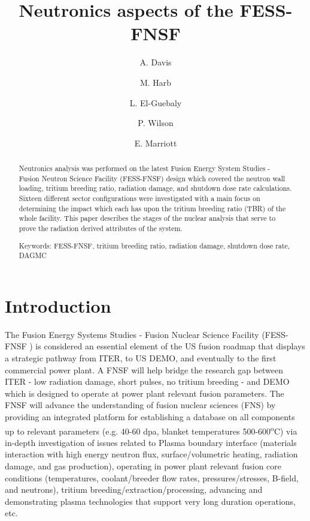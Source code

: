 \documentclass[12pt, letterpaper]{elsarticle}
\title{Neutronics aspects of the FESS-FNSF}
\author[wisc]{A. Davis\corref{cor1}}
\author[wisc]{M. Harb}
\author[wisc]{L. El-Guebaly}
\author[wisc]{P. Wilson}
\author[wisc]{E. Marriott}
\begin{document}
 
\begin{abstract}
Neutronics analysis was performed on the latest Fusion Energy System Studies - Fusion Neutron Science Facility (FESS-FNSF) design which covered the neutron wall loading, tritium breeding ratio, radiation damage, and shutdown dose rate calculations. Sixteen different sector configurations were investigated with a main focus on determining the impact which each has upon the tritium breeding ratio (TBR) of the whole facility. This paper describes the stages of the nuclear analysis that serve to prove the radiation derived attributes of the system.

\vspace{5mm}
\noindent
Keywords: FESS-FNSF, tritium breeding ratio, radiation damage, shutdown dose rate, DAGMC
\end{abstract}

\begin{titlepage}
\maketitle
\end{titlepage}

\newpage
\listoffigures

\newpage
\section{Introduction} \label{Introduction}
The Fusion Energy Systems Studies - Fusion Nuclear Science Facility (FESS-FNSF \cite{ref_1}) is considered an essential element of the US fusion roadmap that displays a strategic  pathway from ITER, to US DEMO, and eventually to the first commercial power plant. A FNSF will help bridge the research gap between ITER - low radiation damage, short pulses, no tritium breeding - and DEMO which is designed to operate at power plant relevant fusion parameters. The FNSF will advance the understanding of fusion nuclear sciences (FNS) by providing an integrated platform for establishing a database on all components up to relevant parameters (e.g. 40-60 dpa, blanket temperatures 500-600\textsuperscript{o}C) via in-depth investigation of issues related to Plasma boundary interface (materials interaction with high energy neutron flux, surface/volumetric heating, radiation damage, and gas production), operating in power plant relevant fusion core conditions (temperatures, coolant/breeder flow rates, pressures/stresses, B-field, and neutrons), tritium breeding/extraction/processing, advancing and demonstrating plasma technologies that support very long duration operations, etc.\vspace{5mm}
\end{document}
